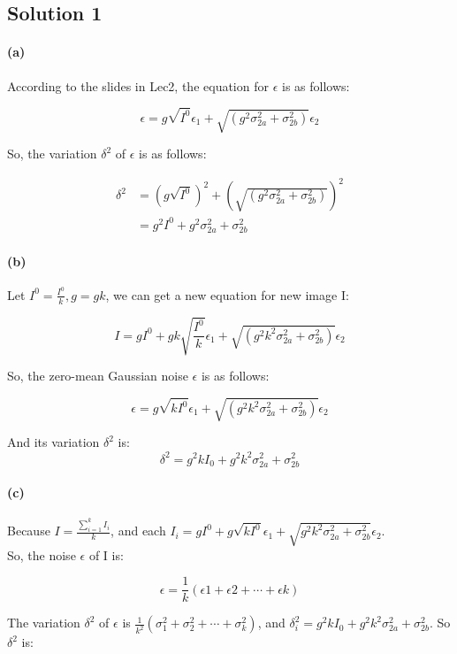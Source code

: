 \documentclass{article}
\newcommand{\solution}[1]{\clearpage \subsection*{Solution #1}}  %
\newcommand{\spart}[1]{\paragraph{(#1)}}
\begin{document}

\solution{1}

\spart{a} 
	According to the slides in Lec2, the equation for $\epsilon$ is as follows:

\begin{equation}
  	\epsilon = g\sqrt{I^0}\epsilon_{1} + \sqrt{\left(g^2\sigma^2_{2a} + \sigma^2_{2b}\right)}\epsilon_{2}
\label{noise1}
\end{equation}

	So, the variation $\delta^2$ of $\epsilon$ is as follows:

\begin{align}
	\delta^2 &= \left(g\sqrt{I^0}\right)^2 + \left(\sqrt{\left(g^2\sigma^2_{2a} + \sigma^2_{2b}\right)}\right)^2\\
	&= g^2I^0 + g^2\sigma^2_{2a} + \sigma^2_{2b} 
	\label{variation1}
\end{align}

\spart{b} 
	Let $I^0 = \frac{I^0}{k}, g = gk$, we can get a new equation for new image I:

\begin{equation}
	I = gI^0 + gk\sqrt{\frac{I^0}{k}}\epsilon_{1} + \sqrt{\left(g^2k^2\sigma^2_{2a} + \sigma^2_{2b}\right)}\epsilon_{2}
\end{equation}

So, the zero-mean Gaussian noise $\epsilon$ is as follows:

\begin{equation}
	\epsilon = g\sqrt{kI^0}\epsilon_{1} + \sqrt{\left(g^2k^2\sigma^2_{2a} + \sigma^2_{2b}\right)}\epsilon_{2}
\end{equation}

	And its variation $\delta^2$ is:
\begin{equation}
	\delta^2 = g^2kI_{0}+ g^2k^2\sigma^2_{2a} + \sigma^2_{2b}
\end{equation}

\spart{c} 
	Because $I = \frac{\sum_{i=1}^{k}I_{i}}{k}$, and each $I_{i} = gI^0 + g\sqrt{kI^0}\epsilon_{1} + \sqrt{g^2k^2\sigma^2_{2a} + \sigma^2_{2b}}\epsilon_{2}$.\\
	So, the noise $\epsilon$ of I is:

\begin{equation}
	\epsilon = \frac{1}{k}\left(\epsilon1 + \epsilon2 + \cdots + \epsilon k \right)
\end{equation}

	The variation $\delta^2$ of $\epsilon$ is $\frac{1}{k^2}\left(\sigma^2_{1} + \sigma^2_{2} + \cdots + \sigma^2_{k}\right)$, and $\delta^2_{i} = g^2kI_{0} + g^2k^2\sigma^2_{2a} + \sigma^2_{2b}$. So $\delta^2$ is:
\end{document}

